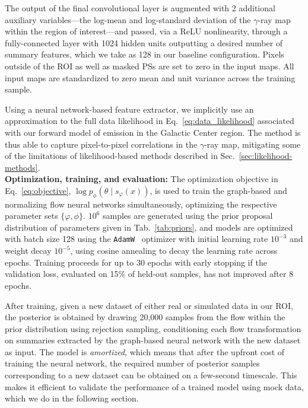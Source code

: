 \documentclass[prd,aps,10pt,nofootinbib,twocolumn,superscriptaddress,preprintnumbers,balancelastpage,longbibliography]{revtex4-1}
\begin{document}
The output of the final convolutional layer is augmented with 2 additional auxiliary variables---the log-mean and log-standard deviation of the $\gamma$-ray map within the region of interest---and passed, via a ReLU nonlinearity, through a fully-connected layer with 1024 hidden units outputting a desired number of summary features, which we take as 128 in our baseline configuration. Pixels outside of the ROI as well as masked PSs are set to zero in the input maps. All input maps are standardized to zero mean and unit variance across the training sample.

Using a neural network-based feature extractor, we implicitly use an approximation to the full data likelihood in Eq.~\eqref{eq:data_likelihood} associated with our forward model of emission in the Galactic Center region. The method is thus able to capture pixel-to-pixel correlations in the $\gamma$-ray map, mitigating some of the limitations of likelihood-based methods described in Sec.~\ref{sec:likelihood-methods}. \\

\noindent
\textbf{Optimization, training, and evaluation:} The optimization objective in Eq.~\eqref{eq:objective}, $\log p_\phi(\theta\mid s_\varphi(x))$, is used to train the graph-based and normalizing flow neural networks simultaneously, optimizing the respective parameter sets $\{\varphi, \phi\}$. $10^{6}$ samples are generated using the prior proposal distribution of parameters given in Tab.~\ref{tab:priors}, and models are optimized with batch size 128 using the \texttt{AdamW}~\cite{KingmaB14,loshchilov2018decoupled} optimizer with initial learning rate $10^{-3}$ and weight decay $10^{-5}$, using cosine annealing to decay the learning rate across epochs. Training proceeds for up to 30 epochs with early stopping if the validation loss, evaluated on 15\% of held-out samples, has not improved after 8 epochs. 

After training, given a new dataset of either real or simulated \Fermi data in our ROI, the posterior is obtained by drawing 20,000 samples from the flow within the prior distribution using rejection sampling, conditioning each flow transformation on summaries extracted by the graph-based neural network with the new dataset as input. The model is \emph{amortized}, which means that after the upfront cost of training the neural network, the required number of posterior samples corresponding to a new dataset can be obtained on a few-second timescale. This makes it efficient to validate the performance of a trained model using mock data, which we do in the following section.
\end{document}
